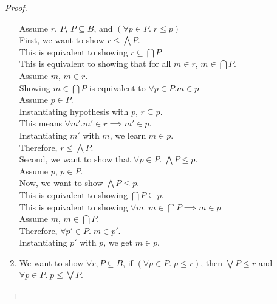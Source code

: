 \begin{proof}
\begin{enumerate}
  \begin{tabbedproof}
    \oo Assume $r$, $P$, $P \subseteq B$, and $(\forall p \in P.\; r \leq p)$ \\[1em]
    \ooo First, we want to show $r \leq \bigwedge P$. \\
    \oooo This is equivalent to showing $r \subseteq \bigcap P$ \\
    \oooo This is equivalent to showing that for all $m \in r$, $m \in \bigcap P$. \\
    \oooo Assume $m$, $m \in r$.  \\
    \ooooo Showing $m \in \bigcap P$ is equivalent to $\forall p \in P. m \in p$ \\
    \ooooo Assume $p \in P$.  \\
    \oooooo Instantiating hypothesis with $p$, $r \subseteq p$. \\
    \oooooo This means $\forall m'. m' \in r \implies m' \in p$. \\
    \oooooo Instantiating $m'$ with $m$, we learn $m \in p$. \\
    \oooo Therefore, $r \leq \bigwedge P$. \\[1em]
    \ooo Second, we want to show that $\forall p \in P.\; \bigwedge P \leq p$. \\
    \ooo Assume $p$, $p \in P$. \\
    \oooo Now, we want to show $\bigwedge P \leq p$. \\
    \oooo This is equivalent to showing $\bigcap P \subseteq p$. \\
    \oooo This is equivalent to showing $\forall m.\; m \in \bigcap P \implies m \in p$ \\
    \oooo Assume $m$, $m \in \bigcap P$.  \\
    \ooooo Therefore, $\forall p' \in P.\; m \in p'$. \\
    \ooooo Instantiating $p'$ with $p$, we get $m \in p$. \\
  \end{tabbedproof}

\item We want to show $\forall r, P \subseteq B$, if $(\forall p \in P.\; p \leq r)$, then
$\bigvee P \leq r$ and $\forall p \in P.\; p \leq \bigvee P$. 


\end{enumerate}
\end{proof}
